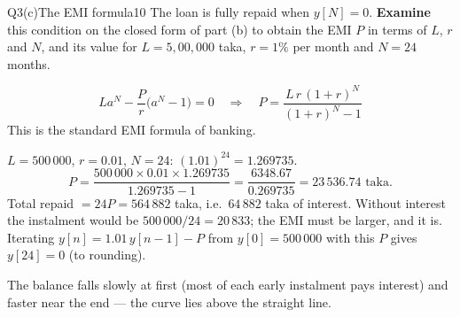 \begin{qcard}{Q3(c)}{The EMI formula}{10}
The loan is fully repaid when $y[N]=0$. \textbf{Examine} this condition on the closed form of part (b) to obtain the EMI $P$ in terms of $L$, $r$ and $N$, and its value for $L=5{,}00{,}000$ taka, $r=1\%$ per month and $N=24$ months.
\end{qcard}
\begin{solution}
\[La^N-\frac Pr\big(a^N-1\big)=0\quad\Longrightarrow\quad\boxed{P=\frac{L\,r\,(1+r)^N}{(1+r)^N-1}}\]
This is the standard EMI formula of banking.

 $L=500\,000$, $r=0.01$, $N=24$: $(1.01)^{24}=1.269735$.
\[P=\frac{500\,000\times0.01\times1.269735}{1.269735-1}=\frac{6348.67}{0.269735}=23\,536.74\text{ taka}.\]
 Total repaid $=24P=564\,882$ taka, i.e.\ $64\,882$ taka of interest. Without interest the instalment would be $500\,000/24=20\,833$; the EMI must be larger, and it is. Iterating $y[n]=1.01\,y[n-1]-P$ from $y[0]=500\,000$ with this $P$ gives $y[24]=0$ (to rounding).
\begin{center}
\end{center}
{\small The balance falls slowly at first (most of each early instalment pays interest) and faster near the end --- the curve lies above the straight line.}
\end{solution}
